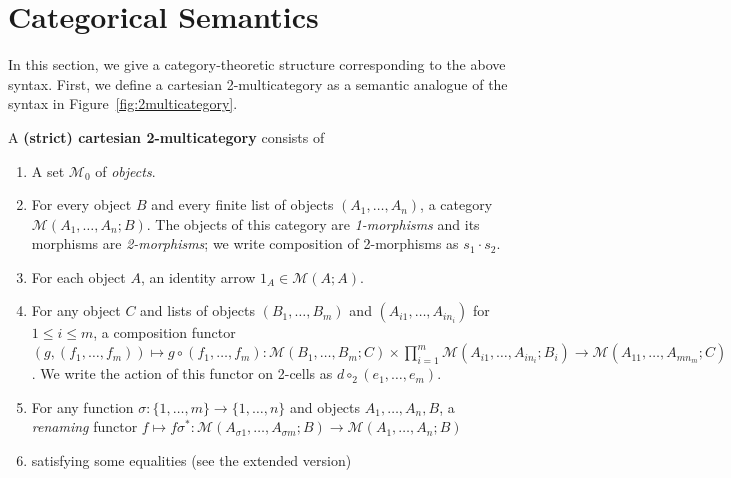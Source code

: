 \documentclass[a4paper,USenglish]{lipics-v2016}
\newcommand\Fsymb[0]{\dsd{F}}
\newcommand\Usymb[0]{\dsd{U}}
\def\M{\mathcal{M}}
\newcommand\compv[2]{\ensuremath{#1 \cdot #2}}
\newcommand\comph[2]{\ensuremath{#1 \mathbin{\circ_2} #2}}
\begin{document}

\newcommand\cD{\ensuremath{\mathcal{D}}}
\newcommand\IndF[3]{\ensuremath{{#1}^\Fsymb_{{#2},{#3}}}}
\newcommand\IndU[4]{\ensuremath{{#1}^\Usymb_{{#2},{#3},{#4}}}}

\section{Categorical Semantics}
\label{sec:semantics}

In this section, we give a category-theoretic structure corresponding to
the above syntax.  First, we define a cartesian 2-multicategory as a
semantic analogue of the syntax in Figure~\ref{fig:2multicategory}. 


\begin{definition}
  A \textbf{(strict) cartesian 2-multicategory} consists of
  \begin{enumerate}
  \item A set $\M_0$ of \emph{objects}.
  \item For every object $B$ and every finite list of objects $(A_1,\dots,A_n)$, a category $\M(A_1,\dots,A_n;B)$.
    The objects of this category are \emph{1-morphisms} and its morphisms are \emph{2-morphisms}; we write composition of 2-morphisms as $\compv{s_1}{s_2}$.
  \item For each object $A$, an identity arrow $1_A\in\M(A;A)$.
  \item For any object $C$ and lists of objects $(B_1,\dots,B_m)$ and
    $(A_{i1},\dots,A_{in_i})$ for $1\le i\le m$, a composition functor
    $(g,(f_1,\dots,f_m)) \mapsto g\circ (f_1,\dots,f_m) : 
    \M(B_1,\dots,B_m;C) \times \prod_{i=1}^m \M(A_{i1},\dots,A_{in_i};B_i) \longrightarrow \M(A_{11},\dots,A_{mn_m};C)$.
    We write the action of this functor on 2-cells as $\comph{d}{(e_1,\dots,e_m)}$.
  \item For any function $\sigma : \{1,\dots,m\} \to \{1,\dots,n\}$ and
    objects $A_1,\dots,A_n,B$, a \emph{renaming} functor $f \mapsto
    f\sigma^* : \M(A_{\sigma 1},\dots,A_{\sigma m}; B) \to \M(A_1,\dots,A_n;B)$
  \item satisfying some equalities (see the extended version)
  \end{enumerate}
\end{definition}
\end{document}

